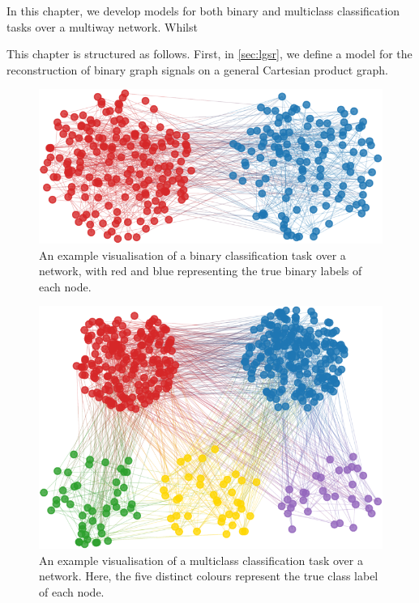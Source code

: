 In this chapter, we develop models for both binary and multiclass classification tasks over a multiway network. Whilst 


This chapter is structured as follows. First, in \cref{sec:lgsr}, we define a model for the reconstruction of binary graph signals on a general Cartesian product graph. 


\cite{Li2012}




\begin{figure}[t] 
    \begin{center}
        \includegraphics[width=0.7\linewidth]{Figures/2class_graph.pdf}
    \end{center}
   \caption[Visualisation of a binary classification task over a network]{An example visualisation of a binary classification task over a network, with red and blue representing the true binary labels of each node.} 
    \label{fig:binary_class_graph}
\end{figure} 

\begin{figure}[t] 
    \begin{center}
        \includegraphics[width=0.7\linewidth]{Figures/multiclass_graph.pdf}
    \end{center}
   \caption[Visualisation of a multiclass classification task over a network]{An example visualisation of a multiclass classification task over a network. Here, the five distinct colours represent the true class label of each node. } 
    \label{fig:mutliclass_graph}
\end{figure} 



